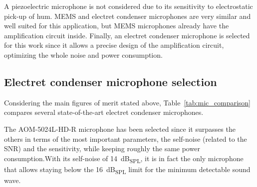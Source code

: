 \documentclass{EPL-master-thesis-covers-EN}
\begin{document}
A piezoelectric microphone is not considered due to its sensitivity to electrostatic pick-up of hum. MEMS and electret condenser microphones are very similar and well suited for this application, but MEMS microphones already have the amplification circuit inside.
Finally, an electret condenser microphone is selected for this work since it allows a precise design of the amplification circuit, optimizing the whole noise and power consumption.

\subsection*{Electret condenser microphone selection}

Considering the main figures of merit stated above, Table~\ref{tab:mic_comparison} compares several state-of-the-art electret condenser microphones.

\begin{table}[H]
\centering
{}
\caption{Comparison of several electret condenser microphones}
\label{tab:mic_comparison}
\end{table}

The AOM-5024L-HD-R microphone has been selected since it surpasses the others in terms of the most important parameters, the self-noise (related to the SNR) and the sensitivity, while keeping roughly the same power consumption.With its self-noise of \SI{14}{dB_{SPL}}, it is in fact the only microphone that allows staying below the \SI{16}{dB_{SPL}} limit for the minimum detectable sound wave.
\end{document}
